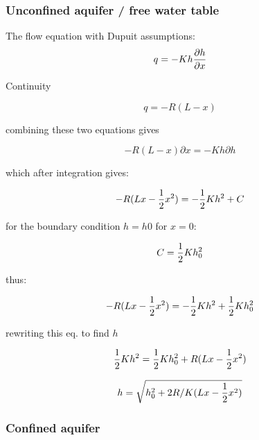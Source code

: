 \documentclass[11pt]{article}
\begin{document}
\subsubsection{Unconfined aquifer / free water table}

The flow equation with Dupuit assumptions:
\begin{equation}
    q = - K h {\partial h \over{\partial x}}
\end{equation}

Continuity

\begin{equation}
    q = - R (L-x)
\end{equation}

combining these two equations gives

\begin{equation}
    - R (L-x) \partial x = - K h \partial h
\end{equation}

which after integration gives:

\begin{equation}
    - R (Lx - {1\over{2}} x^{2}) = - {1\over{2}} K h ^{2} + C
\end{equation}

for the boundary condition $h = h0$ for $x = 0$:

\begin{equation}
    C = {1\over{2}} K h_{0} ^{2}
\end{equation}

thus:

\begin{equation}
        - R (Lx - {1\over{2}} x^{2}) = - {1\over{2}} K h ^{2} + {1\over{2}} K h_{0} ^{2}
\end{equation}

rewriting this eq. to find $h$

\begin{equation}
        {1\over{2}} K h ^{2} =  {1\over{2}} K h_{0} ^{2} + R (Lx - {1\over{2}} x^{2})
\end{equation}

\begin{equation}
        h = \sqrt{ h_{0} ^{2} + 2 R / K (Lx - {1\over{2}} x^{2}) }
\end{equation}


\subsubsection{Confined aquifer}
\end{document}
